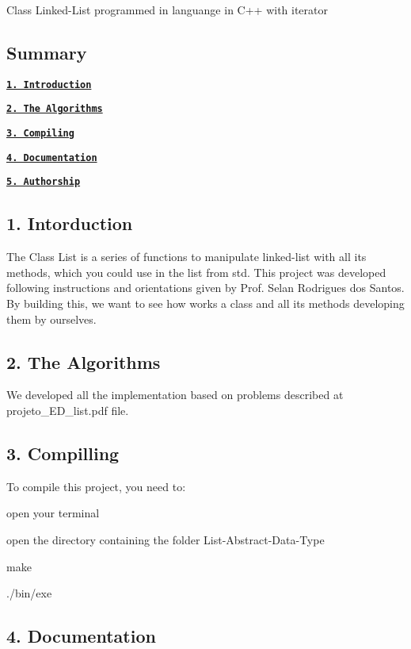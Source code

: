 Class Linked-\/\+List programmed in languange in C++ with iterator

\subsection*{Summary}

{\bfseries \href{#1-introduction}{\tt 1. Introduction}}

{\bfseries \href{#2-the-algorithms}{\tt 2. The Algorithms}}

{\bfseries \href{#3-compiling}{\tt 3. Compiling}}

{\bfseries \href{#4-documentation}{\tt 4. Documentation}}

{\bfseries \href{#5-authorship}{\tt 5. Authorship}}

\subsection*{1. Intorduction}

The Class List is a series of functions to manipulate linked-\/list with all its methods, which you could use in the list from std. This project was developed following instructions and orientations given by Prof. Selan Rodrigues dos Santos. By building this, we want to see how works a class and all its methods developing them by ourselves.

\subsection*{2. The Algorithms}

We developed all the implementation based on problems described at {\ttfamily projeto\+\_\+\+E\+D\+\_\+list.\+pdf} file.

\subsection*{3. Compilling}

To compile this project, you need to\+:

{\ttfamily open your terminal}

{\ttfamily open the directory containing the folder List-\/\+Abstract-\/\+Data-\/\+Type}

{\ttfamily make}

{\ttfamily ./bin/exe}

\subsection*{4. Documentation}

